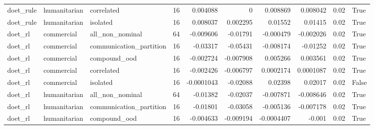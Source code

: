\begin{table}
\begin{tabular}{lllrrrrrrl}
doet\_rule & humanitarian &              correlated &               16 &                   0.004088 &                              0 &                        0.008869 &                           0.008042 &                   0.02 &         True \\
doet\_rule & humanitarian &                isolated &               16 &                   0.008037 &                       0.002295 &                         0.01552 &                            0.01415 &                   0.02 &         True \\
  doet\_rl &   commercial &         all\_non\_nominal &               64 &                  -0.009606 &                       -0.01791 &                       -0.000479 &                          -0.002026 &                   0.02 &         True \\
  doet\_rl &   commercial & communication\_partition &               16 &                   -0.03317 &                       -0.05431 &                       -0.008174 &                           -0.01252 &                   0.02 &         True \\
  doet\_rl &   commercial &            compound\_ood &               16 &                  -0.002724 &                      -0.007908 &                        0.005266 &                           0.003561 &                   0.02 &         True \\
  doet\_rl &   commercial &              correlated &               16 &                  -0.002426 &                      -0.006797 &                       0.0002174 &                          0.0001087 &                   0.02 &         True \\
  doet\_rl &   commercial &                isolated &               16 &                 -0.0001043 &                       -0.02088 &                         0.02398 &                            0.02017 &                   0.02 &        False \\
  doet\_rl & humanitarian &         all\_non\_nominal &               64 &                   -0.01382 &                       -0.02037 &                       -0.007871 &                          -0.008646 &                   0.02 &         True \\
  doet\_rl & humanitarian & communication\_partition &               16 &                   -0.01801 &                       -0.03058 &                       -0.005136 &                          -0.007178 &                   0.02 &         True \\
  doet\_rl & humanitarian &            compound\_ood &               16 &                  -0.004633 &                      -0.009194 &                      -0.0004407 &                             -0.001 &                   0.02 &         True \\

\end{tabular}
\end{table}
